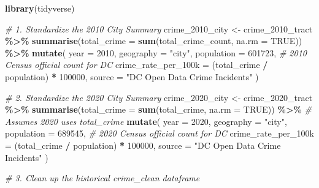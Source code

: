\documentclass[
]{article}
\newenvironment{Shaded}{\begin{snugshade}}{\end{snugshade}}
\newcommand{\AttributeTok}[1]{\textcolor[rgb]{0.13,0.29,0.53}{#1}}
\newcommand{\CommentTok}[1]{\textcolor[rgb]{0.56,0.35,0.01}{\textit{#1}}}
\newcommand{\ConstantTok}[1]{\textcolor[rgb]{0.56,0.35,0.01}{#1}}
\newcommand{\DecValTok}[1]{\textcolor[rgb]{0.00,0.00,0.81}{#1}}
\newcommand{\FunctionTok}[1]{\textcolor[rgb]{0.13,0.29,0.53}{\textbf{#1}}}
\newcommand{\NormalTok}[1]{#1}
\newcommand{\OtherTok}[1]{\textcolor[rgb]{0.56,0.35,0.01}{#1}}
\newcommand{\SpecialCharTok}[1]{\textcolor[rgb]{0.81,0.36,0.00}{\textbf{#1}}}
\newcommand{\StringTok}[1]{\textcolor[rgb]{0.31,0.60,0.02}{#1}}
\begin{document}
\begin{Shaded}
\begin{Highlighting}[]
\FunctionTok{library}\NormalTok{(tidyverse)}

\CommentTok{\# 1. Standardize the 2010 City Summary}
\NormalTok{crime\_2010\_city }\OtherTok{\textless{}{-}}\NormalTok{ crime\_2010\_tract }\SpecialCharTok{\%\textgreater{}\%}
  \FunctionTok{summarise}\NormalTok{(}\AttributeTok{total\_crime =} \FunctionTok{sum}\NormalTok{(total\_crime\_count, }\AttributeTok{na.rm =} \ConstantTok{TRUE}\NormalTok{)) }\SpecialCharTok{\%\textgreater{}\%}
  \FunctionTok{mutate}\NormalTok{(}
    \AttributeTok{year =} \DecValTok{2010}\NormalTok{,}
    \AttributeTok{geography =} \StringTok{"city"}\NormalTok{,}
    \AttributeTok{population =} \DecValTok{601723}\NormalTok{, }\CommentTok{\# 2010 Census official count for DC}
    \AttributeTok{crime\_rate\_per\_100k =}\NormalTok{ (total\_crime }\SpecialCharTok{/}\NormalTok{ population) }\SpecialCharTok{*} \DecValTok{100000}\NormalTok{,}
    \AttributeTok{source =} \StringTok{"DC Open Data Crime Incidents"}
\NormalTok{  )}

\CommentTok{\# 2. Standardize the 2020 City Summary}
\NormalTok{crime\_2020\_city }\OtherTok{\textless{}{-}}\NormalTok{ crime\_2020\_tract }\SpecialCharTok{\%\textgreater{}\%}
  \FunctionTok{summarise}\NormalTok{(}\AttributeTok{total\_crime =} \FunctionTok{sum}\NormalTok{(total\_crime, }\AttributeTok{na.rm =} \ConstantTok{TRUE}\NormalTok{)) }\SpecialCharTok{\%\textgreater{}\%} \CommentTok{\# Assumes 2020 uses \textquotesingle{}total\_crime\textquotesingle{}}
  \FunctionTok{mutate}\NormalTok{(}
    \AttributeTok{year =} \DecValTok{2020}\NormalTok{,}
    \AttributeTok{geography =} \StringTok{"city"}\NormalTok{,}
    \AttributeTok{population =} \DecValTok{689545}\NormalTok{, }\CommentTok{\# 2020 Census official count for DC}
    \AttributeTok{crime\_rate\_per\_100k =}\NormalTok{ (total\_crime }\SpecialCharTok{/}\NormalTok{ population) }\SpecialCharTok{*} \DecValTok{100000}\NormalTok{,}
    \AttributeTok{source =} \StringTok{"DC Open Data Crime Incidents"}
\NormalTok{  )}

\CommentTok{\# 3. Clean up the historical \textquotesingle{}crime\_clean\textquotesingle{} dataframe}


\end{Highlighting}
\end{Shaded}
\end{document}
